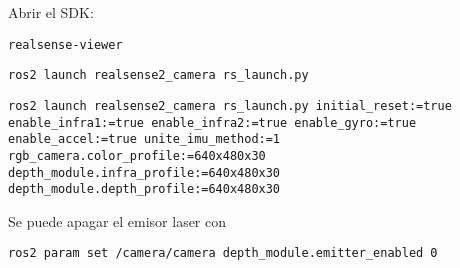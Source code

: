 \documentclass[apunte]{lcc}
\begin{document}
Abrir el SDK:
\begin{lstlisting}[style=bash]
realsense-viewer
\end{lstlisting}

\begin{lstlisting}[style=bash]
ros2 launch realsense2_camera rs_launch.py
\end{lstlisting}

\begin{lstlisting}[style=bash]
ros2 launch realsense2_camera rs_launch.py initial_reset:=true enable_infra1:=true enable_infra2:=true enable_gyro:=true enable_accel:=true unite_imu_method:=1 rgb_camera.color_profile:=640x480x30 depth_module.infra_profile:=640x480x30 depth_module.depth_profile:=640x480x30
\end{lstlisting}

Se puede apagar el emisor laser con

\begin{lstlisting}[style=bash]
ros2 param set /camera/camera depth_module.emitter_enabled 0
\end{lstlisting}
\end{document}
